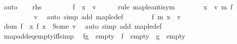 \begin{isabellebody}
\ auto\isanewline
\ \ \isamarkupfalse%
\ {\isacharquery}{\kern0pt}rhs\isanewline
\ \ \isamarkupfalse%
\isanewline
\ \ \ \ \isamarkupfalse%
\ {\isachardoublequoteopen}f\ {\isacharequal}{\kern0pt}\ {\isacharbrackleft}{\kern0pt}x\ {\isasymmapsto}\ v{\isacharbrackright}{\kern0pt}{\isachardoublequoteclose}\isanewline
\ \ \ \ \isamarkupfalse%
\ {\isacharparenleft}{\kern0pt}rule\ map{\isacharunderscore}{\kern0pt}le{\isacharunderscore}{\kern0pt}antisym{\isacharparenright}{\kern0pt}\isanewline
\ \ \ \ \ \ \isamarkupfalse%
\ {\isachardoublequoteopen}{\isacharbrackleft}{\kern0pt}x\ {\isasymmapsto}\ v{\isacharbrackright}{\kern0pt}\ {\isasymsubseteq}\isactrlsub m\ f{\isachardoublequoteclose}\isanewline
\ \ \ \ \ \ \ \ \isamarkupfalse%
\ v\ \isamarkupfalse%
\ {\isacharparenleft}{\kern0pt}auto\ simp\ add{\isacharcolon}{\kern0pt}\ map{\isacharunderscore}{\kern0pt}le{\isacharunderscore}{\kern0pt}def{\isacharparenright}{\kern0pt}\isanewline
\ \ \ \ \ \ \isamarkupfalse%
\ {\isachardoublequoteopen}f\ {\isasymsubseteq}\isactrlsub m\ {\isacharbrackleft}{\kern0pt}x\ {\isasymmapsto}\ v{\isacharbrackright}{\kern0pt}{\isachardoublequoteclose}\isanewline
\ \ \ \ \ \ \ \ \isamarkupfalse%
\ {\isacartoucheopen}dom\ f\ {\isacharequal}{\kern0pt}\ {\isacharbraceleft}{\kern0pt}x{\isacharbraceright}{\kern0pt}{\isacartoucheclose}\ {\isacartoucheopen}f\ x\ {\isacharequal}{\kern0pt}\ Some\ v{\isacartoucheclose}\ \isamarkupfalse%
\ {\isacharparenleft}{\kern0pt}auto\ simp\ add{\isacharcolon}{\kern0pt}\ map{\isacharunderscore}{\kern0pt}le{\isacharunderscore}{\kern0pt}def{\isacharparenright}{\kern0pt}\isanewline
\ \ \ \ \isamarkupfalse%
\isanewline
\ \ \isamarkupfalse%
\isanewline
{}\isamarkupfalse%
%
\endisatagproof
{\isafoldproof}%
%
\isadelimproof
\isanewline
%
\endisadelimproof
\isanewline
{}\isamarkupfalse%
\ map{\isacharunderscore}{\kern0pt}add{\isacharunderscore}{\kern0pt}eq{\isacharunderscore}{\kern0pt}empty{\isacharunderscore}{\kern0pt}iff{\isacharbrackleft}{\kern0pt}simp{\isacharbrackright}{\kern0pt}{\isacharcolon}{\kern0pt}\isanewline
\ \ {\isachardoublequoteopen}{\isacharparenleft}{\kern0pt}f{\isacharplus}{\kern0pt}{\isacharplus}{\kern0pt}g\ {\isacharequal}{\kern0pt}\ empty{\isacharparenright}{\kern0pt}\ {\isasymlongleftrightarrow}\ f\ {\isacharequal}{\kern0pt}\ empty\ {\isasymand}\ g\ {\isacharequal}{\kern0pt}\ empty{\isachardoublequoteclose}\isanewline
%

\end{isabellebody}
